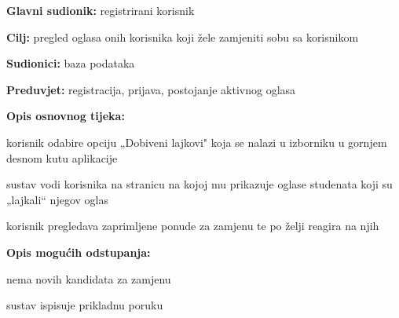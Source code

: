 \noindent {}
\begin{packed_item}
	
	\item \textbf{Glavni sudionik: } registrirani korisnik
	\item  \textbf{Cilj:}  pregled oglasa onih korisnika koji žele zamjeniti sobu sa korisnikom
	\item  \textbf{Sudionici:} baza podataka
	\item  \textbf{Preduvjet:} registracija, prijava, postojanje aktivnog oglasa
	\item  \textbf{Opis osnovnog tijeka:}
	
	\item[] \begin{packed_enum}
		
		\item korisnik odabire opciju „Dobiveni lajkovi" koja se nalazi u izborniku u gornjem desnom kutu aplikacije
		\item sustav vodi korisnika na stranicu na kojoj mu prikazuje oglase studenata koji su „lajkali“ njegov oglas 
		\item korisnik pregledava zaprimljene ponude za zamjenu te po želji reagira na njih
		
	\end{packed_enum}
	
	\item  \textbf{Opis mogućih odstupanja:}
	
	\item[] \begin{packed_item}
		
		\item[2.a] nema novih kandidata za zamjenu
		\item[] \begin{packed_enum}
			
			\item sustav ispisuje prikladnu poruku
			
		\end{packed_enum}
	\end{packed_item}
\end{packed_item}



